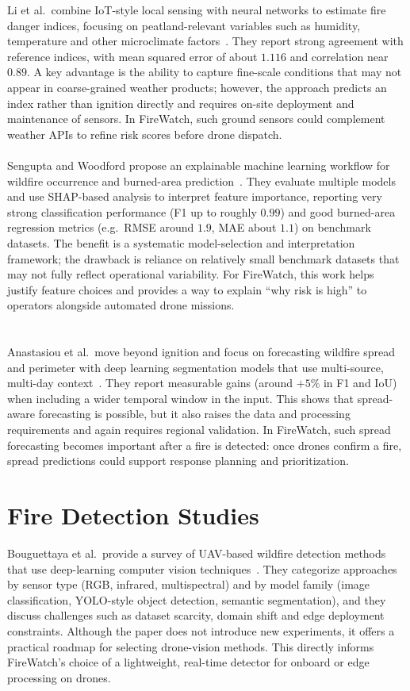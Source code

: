 \documentclass[11pt,a4paper]{report}
\begin{document}
Li et al.\ combine IoT-style local sensing with neural networks to estimate fire danger indices, focusing on peatland-relevant variables such as humidity, temperature and other microclimate factors~\cite{li2023}. They report strong agreement with reference indices, with mean squared error of about $1.116$ and correlation near $0.89$. A key advantage is the ability to capture fine-scale conditions that may not appear in coarse-grained weather products; however, the approach predicts an index rather than ignition directly and requires on-site deployment and maintenance of sensors. In FireWatch, such ground sensors could complement weather APIs to refine risk scores before drone dispatch.
\\ \\
Sengupta and Woodford propose an explainable machine learning workflow for wildfire occurrence and burned-area prediction~\cite{sengupta2025}. They evaluate multiple models and use SHAP-based analysis to interpret feature importance, reporting very strong classification performance (F1 up to roughly $0.99$) and good burned-area regression metrics (e.g.\ RMSE around $1.9$, MAE about $1.1$) on benchmark datasets. The benefit is a systematic model-selection and interpretation framework; the drawback is reliance on relatively small benchmark datasets that may not fully reflect operational variability. For FireWatch, this work helps justify feature choices and provides a way to explain ``why risk is high'' to operators alongside automated drone missions.
\\ \\ \\
Anastasiou et al.\ move beyond ignition and focus on forecasting wildfire spread and perimeter with deep learning segmentation models that use multi-source, multi-day context~\cite{anastasiou2025}. They report measurable gains (around $+5\%$ in F1 and IoU) when including a wider temporal window in the input. This shows that spread-aware forecasting is possible, but it also raises the data and processing requirements and again requires regional validation. In FireWatch, such spread forecasting becomes important after a fire is detected: once drones confirm a fire, spread predictions could support response planning and prioritization.
\\ 
\section{Fire Detection Studies}

Bouguettaya et al.\ provide a survey of UAV-based wildfire detection methods that use deep-learning computer vision techniques~\cite{bouguettaya2022}. They categorize approaches by sensor type (RGB, infrared, multispectral) and by model family (image classification, YOLO-style object detection, semantic segmentation), and they discuss challenges such as dataset scarcity, domain shift and edge deployment constraints. Although the paper does not introduce new experiments, it offers a practical roadmap for selecting drone-vision methods. This directly informs FireWatch's choice of a lightweight, real-time detector for onboard or edge processing on drones.
\end{document}
